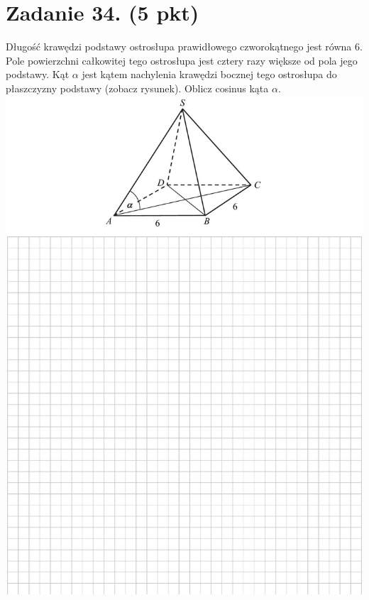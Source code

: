 \documentclass[10pt]{article}
\begin{document}
\section*{Zadanie 34. (5 pkt)}
Długość krawędzi podstawy ostrosłupa prawidłowego czworokątnego jest równa 6. Pole powierzchni całkowitej tego ostrosłupa jest cztery razy większe od pola jego podstawy. Kąt \(\alpha\) jest kątem nachylenia krawędzi bocznej tego ostrosłupa do płaszczyzny podstawy (zobacz rysunek). Oblicz cosinus kąta \(\alpha\).\\
\includegraphics[max width=\textwidth, center]{2024_11_21_d51d653f4fe4a5bb0c33g-24}\\
\end{document}
